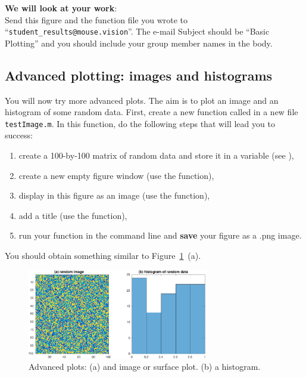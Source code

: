 \documentclass{article}
\begin{document}
\textbf{We will look at your work}: \\
Send this figure and the function file you wrote to ``\verb|student_results@mouse.vision|''. 
The e-mail Subject should be ``Basic Plotting'' and you should include your group member names in the body.


\pagebreak
\subsection{Advanced plotting: images and histograms}

You will now try more advanced plots.
The aim is to plot an image and an histogram of some random data.
First, create a new function called  in a new file \verb|testImage.m|.
In this function, do the following steps that will lead you to success:
\begin{enumerate}
  \item create a 100-by-100 matrix of random data and store it in a variable  (see ),
  \item create a new empty figure window (use the  function),
  \item display in this figure  as an image (use the  function),
  \item add a title (use the  function),
  \item run your function in the command line and \textbf{save} your figure as a .png image.
\end{enumerate}
You should obtain something similar to Figure~\ref{fig:adv}~(a).

\begin{figure}[h]
  \centering
  \includegraphics[width=0.7\textwidth]{advancedplot.pdf}
  \caption{Advanced plots: (a) and image or surface plot. (b) a histogram.}\label{fig:adv}
\end{figure}
\end{document}
